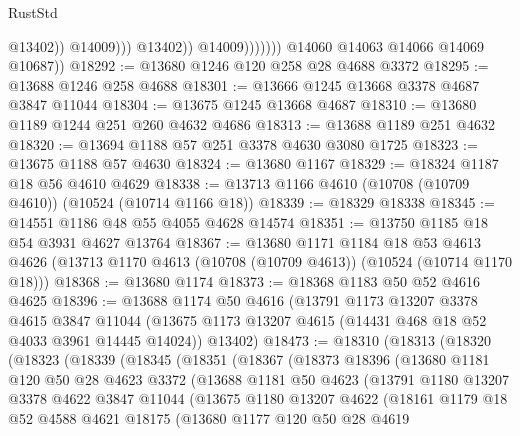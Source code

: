 \begin{lexlean}{RustStd}
\begin{coremodule}
                                    @13402))
                                @14009)))
                          @13402))
                      @14009)))))))
        @14060
        @14063
        @14066
        @14069
        @10687))
@18292 := @13680 @1246 @120 @258 @28 @4688 @3372
@18295 := @13688 @1246 @258 @4688
@18301 := @13666 @1245 @13668 @3378 @4687 @3847 @11044
@18304 := @13675 @1245 @13668 @4687
@18310 := @13680 @1189 @1244 @251 @260 @4632 @4686
@18313 := @13688 @1189 @251 @4632
@18320 := @13694 @1188 @57 @251 @3378 @4630 @3080 @1725
@18323 := @13675 @1188 @57 @4630
@18324 := @13680 @1167
@18329 := @18324 @1187 @18 @56 @4610 @4629
@18338 := @13713 @1166 @4610 (@10708 (@10709 @4610)) (@10524 (@10714 @1166 @18))
@18339 := @18329 @18338
@18345 := @14551 @1186 @48 @55 @4055 @4628 @14574
@18351 := @13750 @1185 @18 @54 @3931 @4627 @13764
@18367 := @13680
    @1171
    @1184
    @18
    @53
    @4613
    @4626
    (@13713 @1170 @4613 (@10708 (@10709 @4613)) (@10524 (@10714 @1170 @18)))
@18368 := @13680 @1174
@18373 := @18368 @1183 @50 @52 @4616 @4625
@18396 := @13688
    @1174
    @50
    @4616
    (@13791
      @1173
      @13207
      @3378
      @4615
      @3847
      @11044
      (@13675 @1173 @13207 @4615 (@14431 @468 @18 @52 @4033 @3961 @14445 @14024))
      @13402)
@18473 := @18310
    (@18313
      (@18320
        (@18323
          (@18339
            (@18345
              (@18351
                (@18367
                  (@18373
                    @18396
                    (@13680
                      @1181
                      @120
                      @50
                      @28
                      @4623
                      @3372
                      (@13688
                        @1181
                        @50
                        @4623
                        (@13791
                          @1180
                          @13207
                          @3378
                          @4622
                          @3847
                          @11044
                          (@13675
                            @1180
                            @13207
                            @4622
                            (@18161
                              @1179
                              @18
                              @52
                              @4588
                              @4621
                              @18175
                              (@13680
                                @1177
                                @120
                                @50
                                @28
                                @4619

\end{coremodule}
\end{lexlean}
